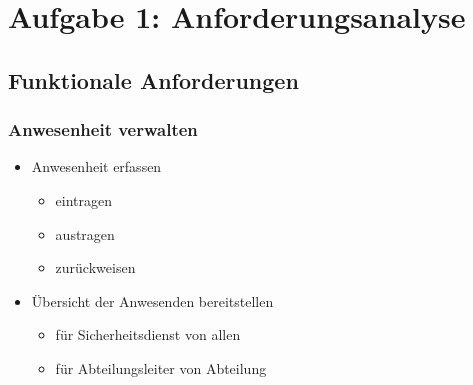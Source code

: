 \newcommand{\customDir}{}




\setCustomSignature{\footnotesize{\textcolor{darkgray}{von Luga, Pour, \\Retsch, Strube}}}	%
\setCustomTitleAuthor{\textcolor{darkgray}{\customAuthor}}	%




\usepackage{adjustbox}
%



\maketitle
\newpage
\tableofcontents
\newpage

\chapter*{Aufgabe 1: Anforderungsanalyse}
\addtocounter{chapter}{1}
\section{Funktionale Anforderungen}
\subsection*{Anwesenheit verwalten}
\begin{itemize}
\item Anwesenheit erfassen
\begin{itemize}
\item eintragen
\item austragen 
\item zurückweisen
\end{itemize}
\item Übersicht der Anwesenden bereitstellen
\begin{itemize}
\item für Sicherheitsdienst von allen
\item für Abteilungsleiter von Abteilung
\end{itemize}
\end{itemize}
